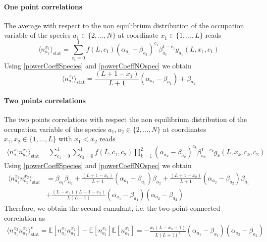 \documentclass[10pt]{article}
\numberwithin{equation}{section}
\numberwithin{equation}{subsection}
\begin{document}
\paragraph{One point correlations}
The average with respect to the non equilibrium distribution of the occupation variable of the species $a_{1}\in \{2,\ldots,N\}$ at coordinate $x_{1}\in \{1,\ldots,L\}$ reads
\begin{equation}
	\langle n_{a_{1}}^{x_{1}}\rangle_{\text{stat}}=\sum_{c_{1}=0}^{1}f(L,c_{1})(\alpha_{a_{1}}-\beta_{a_{1}})^{c_{1}}\beta_{a_{1}}^{1-c_{1}}g_{a_{1}}(L,x_{1},c_{1})
\end{equation}
Using \eqref{powerCoeffSpecies} and \eqref{powerCoeffNOspec} we obtain 
\begin{equation}\label{one-pts-corr}
\langle n_{a_{1}}^{x_{1}}\rangle_{\text{stat}}=\frac{(L+1-x_{1})}{L+1}(\alpha_{a_{1}}-\beta_{a_{1}})+\beta_{a_{1}}
\end{equation}
\paragraph{Two points correlations}
The two points correlations with respect the non equilibrium distribution of the occupation variable of the species $a_{1},a_{2}\in \{2,\ldots,N\}$ at coordinates $x_{1},x_{2}\in \{1,\ldots,L\}$ with $x_{1}< x_{2}$ reads 
\begin{equation}
	\begin{split}
	\langle n_{a_{1}}^{x_{1}}n_{a_{2}}^{x_{2}}\rangle_{\text{stat}}= \sum_{c_{1}=0}^{1}\sum_{c_{2}=0}^{1}f(L,c_{1},c_{2})\prod_{k=1}^{2}(\alpha_{a_{k}}-\beta_{a_{k}})^{c_{k}}\beta_{a_{k}}^{1-c_{k}}g_{k}(L,x_{k},c_{k},c_{2})
	\end{split}
\end{equation}
Using \eqref{powerCoeffSpecies} and \eqref{powerCoeffNOspec} we obtain 
\begin{equation}
	\begin{split}
	\langle n_{a_{1}}^{x_{2}} n_{a_{2}}^{x_{2}}\rangle_{\text{stat}}&=\beta_{a_{1}}\beta_{a_{2}}+\frac{(L+1-x_{1})}{L+1}(\alpha_{a_{1}}-\beta_{a_{1}})\beta_{a_{2}}+\frac{(L+1-x_{2})}{L+1}(\alpha_{a_{2}}-\beta_{a_{2}})\beta_{a_{1}}\\&+\frac{(L-x_{1})(L+1-x_{2})}{L(L+1)}(\alpha_{a_{1}}-\beta_{a_{1}})(\alpha_{a_{2}}-\beta_{a_{2}})
	\end{split}
\end{equation}
Therefore, we obtain the second cumulant, i.e. the two-point connected correlation as 
\begin{equation}\label{two-pts-corr}
	\begin{split}
		\langle n_{a_{1}}^{x_{2}} n_{a_{2}}^{x_{2}}\rangle_{\text{stat}}^{c}=\mathbb{E}[n_{a_{1}}^{x_{1}}n_{a_{2}}^{x_{2}}]-\mathbb{E}[n_{a_{1}}^{x_{1}}]\mathbb{E}[n_{a_{2}}^{x_{2}}]=-\frac{x_{1}(L-x_{2}+1)}{L(L+1)^{2}}\left(\alpha_{a_{1}}-\beta_{a_{1}}\right)\left(\alpha_{a_{2}}-\beta_{a_{2}}\right)
	\end{split}
\end{equation}
\end{document}
